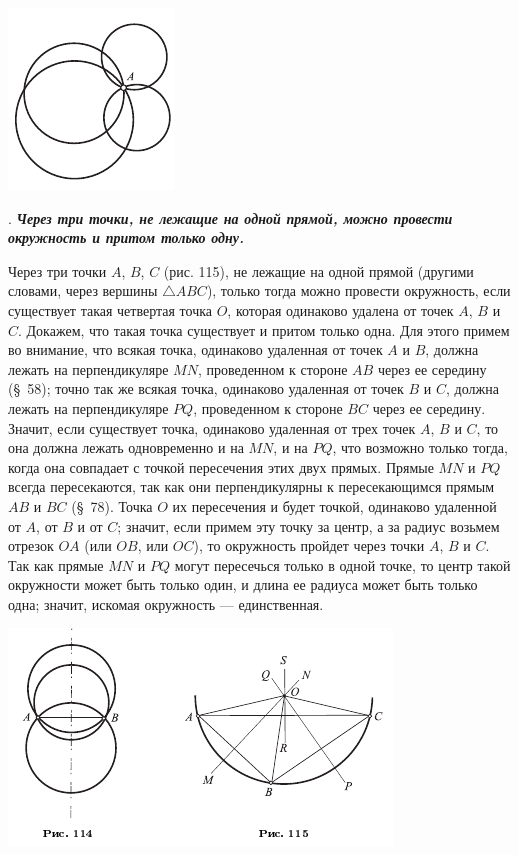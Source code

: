 \documentclass[oneside]{book}
\begin{document}
\includegraphics{pics/ris-113}

.
\textbf{\emph{Через три точки, не лежащие на одной прямой, можно провести окружность и притом только одну.}}

Через три точки $A$, $B$, $C$ (рис. 115), не лежащие на одной прямой (другими словами, через вершины $\triangle ABC$), только тогда можно провести окружность, если существует такая четвертая точка $O$, которая одинаково удалена от точек $A$, $B$ и $C$.
Докажем, что такая точка существует и притом только одна.
Для этого примем во внимание, что всякая точка, одинаково удаленная от точек $A$ и $B$, должна лежать на перпендикуляре $MN$, проведенном к стороне $AB$ через ее середину (§~58);
точно так же всякая точка, одинаково удаленная от точек $B$ и $C$, должна лежать на перпендикуляре $PQ$, проведенном к стороне $BC$ через ее середину.
Значит, если существует точка, одинаково удаленная от трех точек $A$, $B$ и $C$, то она должна лежать одновременно и на $MN$, и на $PQ$, что возможно только тогда, когда она совпадает с точкой пересечения этих двух прямых.
Прямые $MN$ и $PQ$ всегда пересекаются, так как они перпендикулярны к пересекающимся прямым $AB$ и $BC$ (§~78).
Точка $O$ их пересечения и будет точкой, одинаково удаленной от $A$, от $B$ и от $C$;
значит, если примем эту точку за центр, а за радиус возьмем отрезок $OA$ (или $OB$, или $OC$), то окружность пройдет через точки $A$, $B$ и $C$.
Так как прямые $MN$ и $PQ$ могут пересечься только в одной точке, то центр такой окружности может быть только один, и длина ее радиуса может быть только одна;
значит, искомая окружность — единственная.

\includegraphics{pics/ris-114-115}
\end{document}

